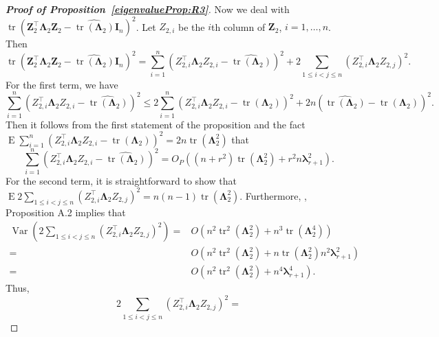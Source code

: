 \documentclass[12pt]{article} %
\DeclareMathOperator{\mytr}{tr}
\DeclareMathOperator{\myE}{E}
\DeclareMathOperator{\myVar}{Var}
\newcommand{\bZ}{\mathbf{Z}}
\newcommand{\bI}{\mathbf{I}}
\newcommand{\bfsym}[1]{\ensuremath{\boldsymbol{#1}}}
\def\blambda {\bfsym {\lambda}}
\def\bLambda {\bfsym {\Lambda}}
\theoremstyle{definition}
\begin{document}
\begin{appendices}
\begin{proof}[\textbf{Proof of Proposition~\ref{eigenvalueProp:R3}}]
    Now we deal with $\mytr(\bZ_2^\top \bLambda_2 \bZ_2-\widehat{\mytr(\bLambda_2)}\bI_n)^2$.
    Let $Z_{2,i}$ be the $i$th column of $\bZ_2$, $i=1,\ldots, n$.
    Then
    \begin{equation*}
        \mytr(\bZ_2^\top \bLambda_2 \bZ_2-\widehat{\mytr(\bLambda_2)}\bI_n)^2
        =
        \sum_{i=1}^n (Z_{2,i}^\top \bLambda_2 Z_{2,i}-\widehat{\mytr(\bLambda_2)})^2
        +
        2\sum_{1\leq i<j\leq n} (Z_{2,i}^\top \bLambda_2 Z_{2,j})^2.
    \end{equation*}
    For the first term, we have 
    \begin{equation*}
        \sum_{i=1}^n (Z_{2,i}^\top \bLambda_2 Z_{2,i}-\widehat{\mytr(\bLambda_2)})^2
        \leq
        2\sum_{i=1}^n (Z_{2,i}^\top \bLambda_2 Z_{2,i}-\mytr(\bLambda_2))^2
        +2n(\widehat{\mytr(\bLambda_2)}-\mytr(\bLambda_2))^2.
    \end{equation*}
    Then it follows from the first statement of the proposition and the fact $
        \myE
        \sum_{i=1}^n (Z_{2,i}^\top \bLambda_2 Z_{2,i}-\mytr(\bLambda_2))^2
        =2n \mytr(\bLambda_2^2)
        $ that
        \begin{equation}\label{abcd1}
        \sum_{i=1}^n (Z_{2,i}^\top \bLambda_2 Z_{2,i}-\widehat{\mytr(\bLambda_2)})^2
        =O_P\left((n+r^2)\mytr(\bLambda_2^2)+r^2 n \blambda_{r+1}^2\right).
\end{equation}
    For the second term, it is straightforward to show that
    $\myE 2\sum_{1\leq i<j\leq n} (Z_{2,i}^\top \bLambda_2 Z_{2,j})^2=n(n-1)\mytr(\bLambda_2^2)$.
    Furthermore, \cite{chen2010tests}, Proposition A.2 implies that
    \begin{equation*}
        \begin{split}
        \myVar\left(
            2\sum_{1\leq i<j\leq n} (Z_{2,i}^\top \bLambda_2 Z_{2,j})^2
        \right)
        =& O\left(
            n^2 \mytr^2 (\bLambda_2^2) + n^3 \mytr(\bLambda_2^4)
        \right)
        \\
        =& O\left(
            n^2 \mytr^2 (\bLambda_2^2) + n \mytr(\bLambda_{2}^2) n^2 \blambda_{r+1}^2
        \right)
        \\
        =& O\left(
            n^2 \mytr^2 (\bLambda_2^2) + n^4 \blambda_{r+1}^4
        \right)
        .
        \end{split}
    \end{equation*}
    Thus,
    \begin{equation*}
            2\sum_{1\leq i<j\leq n} (Z_{2,i}^\top \bLambda_2 Z_{2,j})^2
            =

\end{equation*}
\end{proof}
\end{appendices}
\end{document}
